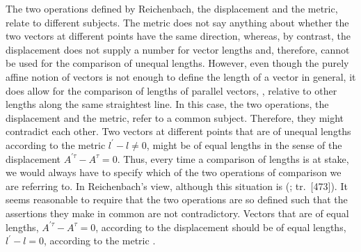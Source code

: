 \documentclass[final]{article}
\renewcommand{\rzlap}[2]{(\cite[#1]{Reichenbach1928}; tr.\ [#2])\xspace}
\begin{document}
The two operations defined by Reichenbach, the displacement and the metric, relate to different subjects. The metric does not say anything about whether the two vectors at different points have the same direction, whereas, by contrast, the displacement does not supply a number for vector lengths and, therefore, cannot be used for the comparison of unequal lengths. However, even though the purely affine notion of vectors is not enough to define the length of a vector in general, it does allow for the comparison of lengths of parallel vectors, \ie, relative to other lengths along the same straightest line. In this case, the two operations, the displacement and the metric, refer to a common subject. Therefore, they might contradict each other. Two vectors at different points that are of unequal lengths according to the metric $l^{\prime}-l \neq 0$, might be of equal lengths in the sense of the displacement $A^{\prime \tau}-A^{\tau}=0$. Thus, every time a comparison of lengths is at stake, we would always have to specify which of the two operations of comparison we are referring to. In Reichenbach's view, although this situation is  \rzlap{339}{473}. It seems reasonable to require that the two operations are so defined such that the assertions they make in common are not contradictory. Vectors that are of equal lengths, $A^{\prime \tau}-A^{\tau}=0$, according to the displacement should be of equal lengths, $l^{\prime}-l = 0$, according to the metric .
\end{document}
